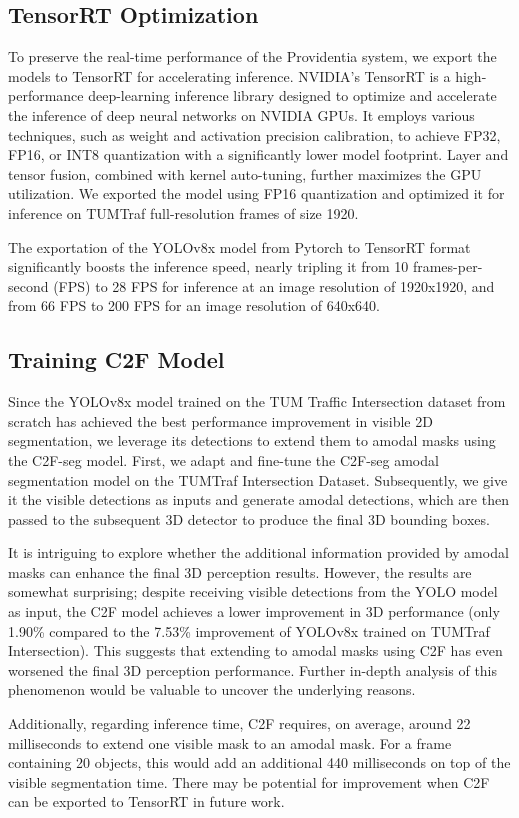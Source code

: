 \subsection{TensorRT Optimization}

To preserve the real-time performance of the Providentia system, we export the models to TensorRT for accelerating inference. NVIDIA’s TensorRT  \cite{vanholder2016efficient} is a high-performance deep-learning inference library designed to optimize and accelerate the inference of deep neural networks on NVIDIA GPUs. It employs various techniques, such as weight and activation precision calibration, to achieve FP32, FP16, or INT8 quantization with a significantly lower model footprint. Layer and tensor fusion, combined with kernel auto-tuning, further maximizes the GPU utilization. We exported the model using FP16 quantization and optimized it for inference on TUMTraf full-resolution frames of size 1920.

The exportation of the YOLOv8x model from Pytorch to TensorRT format significantly boosts the inference speed, nearly tripling it from 10 frames-per-second (FPS) to 28 FPS for inference at an image resolution of 1920x1920, and from 66 FPS to 200 FPS for an image resolution of 640x640.

\subsection{Training C2F Model}

Since the YOLOv8x model trained on the TUM Traffic Intersection dataset from scratch has achieved the best performance improvement in visible 2D segmentation, we leverage its detections to extend them to amodal masks using the C2F-seg model. First, we adapt and fine-tune the C2F-seg amodal segmentation model on the TUMTraf Intersection Dataset. Subsequently, we give it the visible detections as inputs and generate amodal detections, which are then passed to the subsequent 3D detector to produce the final 3D bounding boxes.

It is intriguing to explore whether the additional information provided by amodal masks can enhance the final 3D perception results. However, the results are somewhat surprising; despite receiving visible detections from the YOLO model as input, the C2F model achieves a lower improvement in 3D performance (only 1.90\% compared to the 7.53\% improvement of YOLOv8x trained on TUMTraf Intersection). This suggests that extending to amodal masks using C2F has even worsened the final 3D perception performance. Further in-depth analysis of this phenomenon would be valuable to uncover the underlying reasons.

Additionally, regarding inference time, C2F requires, on average, around 22 milliseconds to extend one visible mask to an amodal mask. For a frame containing 20 objects, this would add an additional 440 milliseconds on top of the visible segmentation time. There may be potential for improvement when C2F can be exported to TensorRT in future work.
